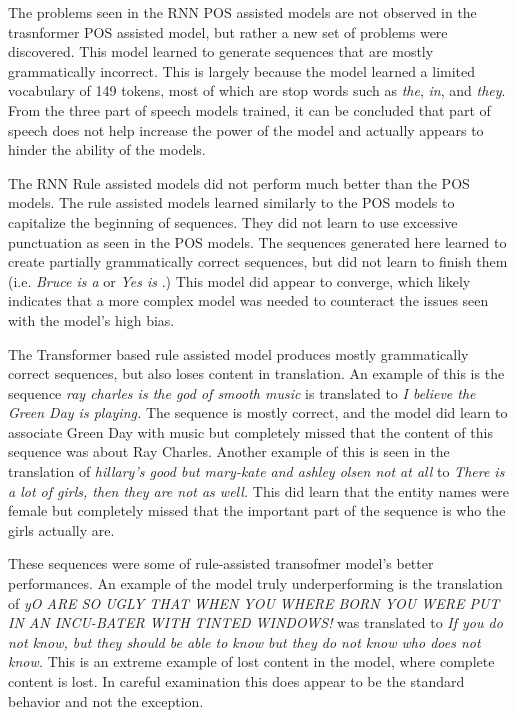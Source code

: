 \documentclass[12pt]{article}
\begin{document}
The problems seen in the RNN POS assisted models are not observed in the trasnformer POS assisted 
model, but rather a new set of problems were discovered. This model learned to generate sequences that 
are mostly grammatically incorrect. This is largely because the model learned a limited vocabulary of 
149 tokens, most of which are stop words such as \textit{the}, \textit{in}, and \textit{they}. From the 
three part of speech models trained, it can be concluded that part of speech does not help increase the 
power of the model and actually appears to hinder the ability of the models. \par

The RNN Rule assisted models did not perform much better than the POS models. The rule assisted models
learned similarly to the POS models to capitalize the beginning of sequences. They did not learn 
to use excessive punctuation as seen in the POS models. The sequences generated here learned to create 
partially grammatically correct sequences, but did not learn to finish them (i.e. \textit{Bruce is a} 
or \textit{Yes is} .) This model did appear to converge, which likely indicates that a more complex
model was needed to counteract the issues seen with the model's high bias. \par

The Transformer based rule assisted model produces mostly grammatically correct sequences,
but also loses content in translation. An example of this is the sequence 
\textit{ray charles is the god of smooth music} is translated to 
\textit{I believe the Green Day is playing.} The sequence is mostly correct, and the model 
did learn to associate Green Day with music but completely missed that the content of 
this sequence was 
about Ray Charles. Another example of this is seen in the translation of \textit{hillary's good but
mary-kate and ashley olsen not at all} to \textit{There is a lot of girls, then they are not as well.}
This did learn that the entity names were female but completely missed that the important part of 
the sequence is who the girls actually are. \par 


These sequences were some of rule-assisted transofmer model's better performances. An example of 
the model truly underperforming
is the translation of \textit{yO ARE SO UGLY THAT WHEN YOU WHERE BORN YOU 
WERE PUT IN AN INCU-BATER WITH TINTED WINDOWS!} was translated to 
\textit{If you do not know, but they should be able to know but they do not know who does not know.}
This is an extreme example of lost content in the model, where complete content is lost.
In careful examination this does appear to be the standard behavior and not the exception.\par 
\end{document}
